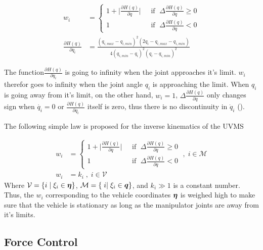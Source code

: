 \begin{align}
	w_{i} &=\begin{cases}
		1 + \bigg|  \frac{\partial H(q)}{\partial q} \bigg| \; & \text{ if } \; \Delta \frac{\partial H(q)}{\partial q} \geq 0
	\\
	1 \; & \text{ if } \; \Delta \frac{\partial H(q)}{\partial q} < 0
	\end{cases}
	\label{eq:weight1}
	\\
	\frac{\partial H(q)}{\partial q_{i}}&=\frac{  \left( q_{i,max} -q_{i,min} \right)^{2} \left( 2q_{i} - q_{i,max} -q_{i,min}  \right)  }{ 4 \left(  q_{i,min} -q_{i} \right)^{2} \left( q_{i} - q_{i,min} \right)^{2}    }
	\label{eq:weight2}
\end{align}

The function$\frac{\partial H(q)}{\partial q_{i}} $ is going to infinity when the joint approaches it's limit. $w_{i}$ therefor goes to infinity when the joint angle $q_{i}$ is approaching the limit. When $q_{i}$ is going away from it's limit, on the other hand, $w_{i} = 1$, 
$\Delta \frac{\partial H(q)}{\partial q}$ only changes sign when $\dot{ q_{	i	}}=0$ or $\frac{\partial H(q)}{\partial q_{i}} $ itself is zero, thus there is no discontinuity in $\dot q_{i}$ (\cite{370511}). 


The following simple law is proposed for the inverse kinematics of the UVMS 

\begin{align}
	w_{i} &=\begin{cases}
		1 + \bigg|  \frac{\partial H(q)}{\partial q} \bigg| \; & \text{ if } \; \Delta \frac{\partial H(q)}{\partial q} \geq 0
	\\
	1 \; & \text{ if } \; \Delta \frac{\partial H(q)}{\partial q} < 0
	\end{cases}
	\; , \; i\in \mathcal M	\\
	w_{i} &= k_{i} \; , \; i\in \mathcal V
	\label{eq:wln-rule}
\end{align}
Where  $\mathcal V = \{i \; | \; \xi_{i} \in \boldsymbol \eta \} $, $\mathcal M = \{ \; i | \; \xi_{i} \in \boldsymbol q \} $, and  $k_{i} \gg 1$ is a constant number. Thus, the $w_{i}$ corresponding to the vehicle coordinates $\boldsymbol \eta$ 
is weighed high to make sure that the vehicle is stationary as long as the manipulator joints are away from it's limits. 

\subsection{Force Control}

